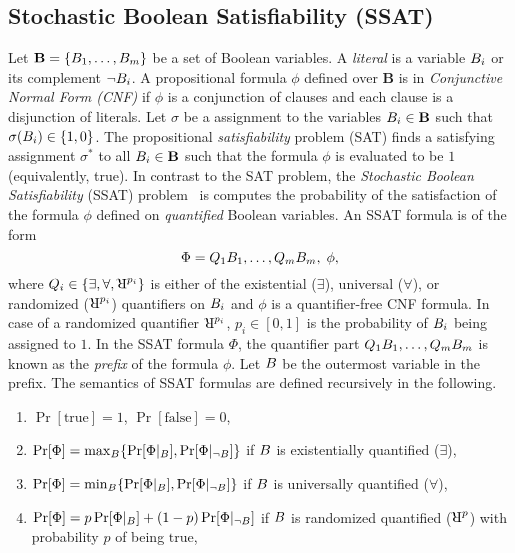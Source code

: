 \subsection*{Stochastic Boolean Satisfiability (SSAT)}\label{fairness_justicia_sec:ssat}
Let $\mathbf{B}  = \{B_1, \dots, B_m\}  $ be a set of Boolean variables. A \textit{literal} is a variable $ B_i $ or its complement $ \neg B_i $. 
A propositional formula $\phi$ defined over $\mathbf{B}$ is in \textit{Conjunctive Normal Form (CNF)} if $\phi$   is  a conjunction of clauses and each clause is a disjunction of literals. 
Let $ \sigma $ be a assignment to the  variables $ B_i \in \mathbf{B} $  such that $ \sigma(B_i) \in \{1, 0\} $. The propositional  \textit{satisfiability} problem (SAT) finds a satisfying assignment $ \sigma^* $ to all $ B_i \in  \mathbf{B} $ such that the formula $ \phi $ is evaluated to be $1$ (equivalently, true). 
In contrast to the SAT problem, the \textit{Stochastic Boolean Satisfiability} (SSAT) problem~\cite{littman2001stochastic} is computes the  probability of the satisfaction of the formula $\phi$ defined on \textit{quantified} Boolean variables. 
An SSAT formula is of the form
\begin{equation}\label{fairness_justicia_eq:ssat}
\Phi = Q_1B_1, \dots, Q_m B_m,\; \phi, 
\end{equation}
where $ Q_i \in \{\exists, \forall, \R^{p_i}\} $ is either of the existential ($\exists$), universal ($\forall$), or randomized ($\R^{p_i}$) quantifiers on $B_i$ and $\phi$ is a quantifier-free CNF formula. In case of a randomized quantifier $ \R^{p_i} $, $ p_i \in [0,1] $ is the probability of $ B_i $ being assigned to $ 1 $. In the SSAT formula $ \Phi $, the quantifier part $ Q_1B_1, \dots, Q_m B_m $ is known as the \textit{prefix} of the formula $ \phi $.  Let $ B $ be the outermost variable in the prefix. The semantics of SSAT formulas are defined recursively in the following.
\begin{enumerate}
	\item $ \Pr[\text{true}] = 1 $,  $ \Pr[\text{false}] = 0 $, 
	\item $ \Pr [\Phi] = \max_{B} \{\Pr[\Phi|_{B}], \Pr[\Phi|_{\neg B}]\}$ if $ B $ is existentially quantified ($ \exists $), 
	\item $ \Pr [\Phi] = \min_{B} \{\Pr[\Phi|_{B}], \Pr[\Phi|_{\neg B}]\} $ if $ B $ is universally quantified ($ \forall $), 
	\item $ \Pr [\Phi] = p\Pr[\Phi|_{B}] + (1-p) \Pr[\Phi|_{\neg B}] $ if $ B $ is randomized quantified ($\R^{p}$) with probability $p$ of being $\text{true}$,
\end{enumerate}
